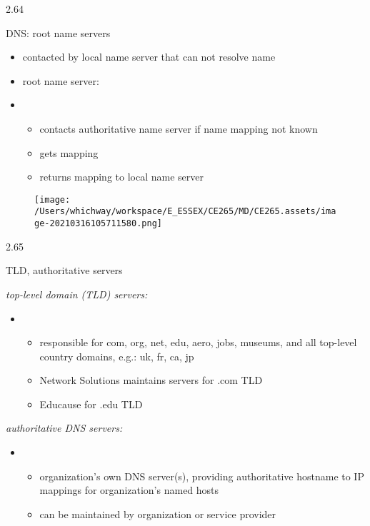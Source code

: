\documentclass[
]{article}
\begin{document}
2.64

DNS: root name servers

\begin{itemize}
\item
  contacted by local name server that can not resolve name
\item
  root name server:
\item
  \begin{itemize}
  \item
    contacts authoritative name server if name mapping not known
  \item
    gets mapping
  \item
    returns mapping to local name server
  \end{itemize}
\end{itemize}

\begin{figure}
\centering
\texttt{[image: /Users/whichway/workspace/E\_ESSEX/CE265/MD/CE265.assets/image-20210316105711580.png]}
\caption{}
\end{figure}

2.65

TLD, authoritative servers

\emph{top-level domain (TLD) servers:}

\begin{itemize}
\item
  \begin{itemize}
  \item
    responsible for com, org, net, edu, aero, jobs, museums, and all
    top-level country domains, e.g.: uk, fr, ca, jp
  \item
    Network Solutions maintains servers for .com TLD
  \item
    Educause for .edu TLD
  \end{itemize}
\end{itemize}

\emph{authoritative DNS servers:}

\begin{itemize}
\item
  \begin{itemize}
  \item
    organization's own DNS server(s), providing authoritative hostname
    to IP mappings for organization's named hosts
  \item
    can be maintained by organization or service provider
  \end{itemize}
\end{itemize}
\end{document}

